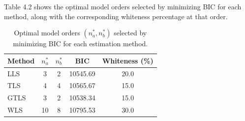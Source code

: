 Table 4.2 shows the optimal model orders selected by minimizing BIC for each method, along with the corresponding whiteness percentage at that order.


\begin{table}[H]
\centering
\begin{tabular}{|l|c|c|c|c|}
\hline
\textbf{Method} & $n_a^*$ & $n_b^*$ & \textbf{BIC} & \textbf{Whiteness (\%)} \\
\hline
LLS & 3 & 2 & 10545.69 & 20.0 \\
\hline
TLS & 4 & 4 & 10565.67 & 15.0 \\
\hline
GTLS & 3 & 2 & 10538.34 & 15.0 \\
\hline
WLS & 10 & 8 & 10795.53 & 30.0 \\
\hline
\end{tabular}
\caption{Optimal model orders $(n_a^*, n_b^*)$ selected by minimizing BIC for each estimation method.}
\label{tab:model_order_bic}
\end{table}


